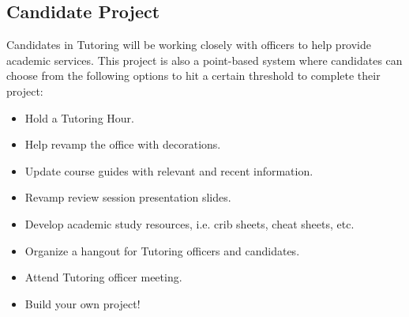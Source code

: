 \documentclass[11pt, article, oneside]{memoir}
\begin{document}
    \subsection{Candidate Project}
        Candidates in Tutoring will be working closely with officers to help provide academic services. This project is also a point-based system where candidates can choose from the following options to hit a certain threshold to complete their project:
        \begin{itemize}
            \item Hold a Tutoring Hour.
            \item Help revamp the office with decorations.
            \item Update course guides with relevant and recent information.
            \item Revamp review session presentation slides.
            \item Develop academic study resources, i.e. crib sheets, cheat sheets, etc.
            \item Organize a hangout for Tutoring officers and candidates.
            \item Attend Tutoring officer meeting.
            \item Build your own project! 
        \end{itemize}
    
    \bigbreak
    


    \newpage
\end{document}
